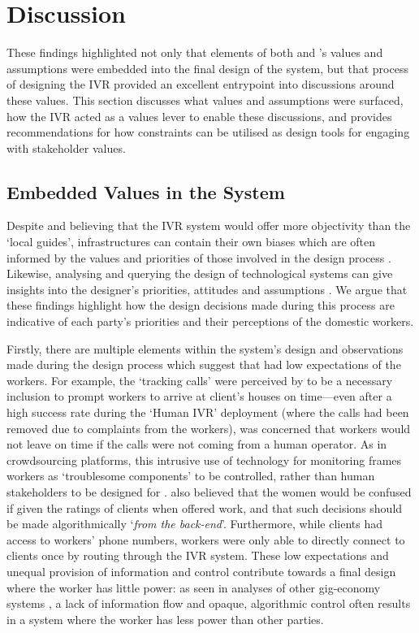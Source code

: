 \section{Discussion}

These findings highlighted not only that elements of both \NGO{} and \PC{}'s values and assumptions were embedded into the final design of the system, but that process of designing the IVR provided an excellent entrypoint into discussions around these values. This section discusses what values and assumptions were surfaced, how the IVR acted as a values lever to enable these discussions, and provides recommendations for how constraints can be utilised as design tools for engaging with stakeholder values.

\subsection{Embedded Values in the System}

Despite \PC{} and \NGO{} believing that the IVR system would offer more objectivity than the `local guides', infrastructures can contain their own biases which are often informed by the values and priorities of those involved in the design process \citep{winner1980}. Likewise, analysing and querying the design of technological systems can give insights into the designer's priorities, attitudes and assumptions \citep{Star1999}. We argue that these findings highlight how the design decisions made during this process are indicative of each party's priorities and their perceptions of the domestic workers.

Firstly, there are multiple elements within the system's design and observations made during the design process which suggest that \PC{} had low expectations of the workers. For example, the `tracking calls' were perceived by \PC{} to be a necessary inclusion to prompt workers to arrive at client's houses on time---even after a high success rate during the `Human IVR' deployment (where the calls had been removed due to complaints from the workers), \PC{} was concerned that workers would not leave on time if the calls were not coming from a human operator. As in crowdsourcing platforms, this intrusive use of technology for monitoring frames workers as `troublesome components' to be controlled, rather than human stakeholders to be designed for \cite{martin2016, Irani2013}. \PC{} also believed that the women would be confused if given the ratings of clients when offered work, and that such decisions should be made algorithmically `\textit{from the back-end}'. Furthermore, while clients had access to workers' phone numbers, workers were only able to directly connect to clients once by routing through the IVR system. These low expectations and unequal provision of information and control contribute towards a final design where the worker has little power: as seen in analyses of other gig-economy systems \cite{martin2016, Hara2018, carlos2021, lee2015}, a lack of information flow and opaque, algorithmic control often results in a system where the worker has less power than other parties. 

